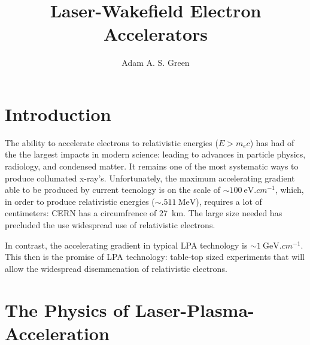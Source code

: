 \documentclass[12pt, titlepage]{caesar_book}
\title{Laser-Wakefield Electron Accelerators}
\author{Adam A. S. Green}
\begin{document}

\maketitle
\tableofcontents

\section{Introduction}
\label{sec:intro}
The ability to accelerate electrons to relativistic energies ($ E > m_e c$) has 
had of the the largest impacts in modern science: leading to advances in 
particle physics, radiology, and condensed matter.
It remains one of the most systematic ways to produce collumated x-ray's.
Unfortunately, the maximum accelerating gradient able to be produced by current 
tecnology is on the scale of $\sim \SI{100}{\electronvolt.cm^{-1}}$, which, in 
order to produce relativistic
energies ($\sim \SI{.511}{\mega\electronvolt}$), requires a lot
of centimeters: CERN has a circumfrence of \SI{27}{km}. The large size needed 
has precluded the use widespread use of relativistic electrons.

In contrast, the accelerating gradient in typical LPA technology is $\sim 
\SI{1}{\giga\electronvolt.cm^{-1}}$. This then is the promise of LPA technology: 
table-top sized experiments that will allow the widespread disemmenation of 
relativistic electrons.  \section{The Physics of Laser-Plasma-Acceleration}
\end{document}
